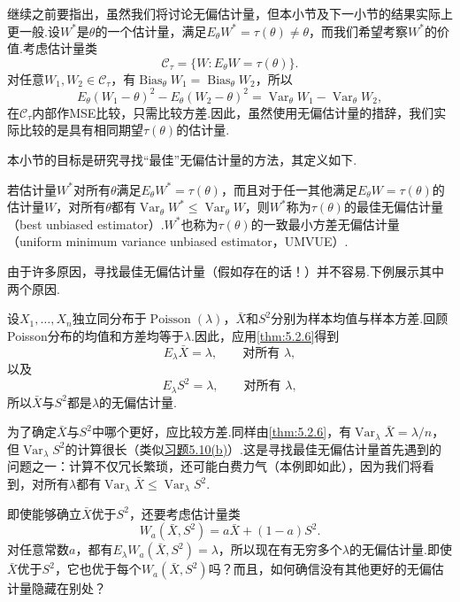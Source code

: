 继续之前要指出，虽然我们将讨论无偏估计量，但本小节及下一小节的结果实际上更一般.设$W^*$是$\theta$的一个估计量，满足$E_\theta W^*=\tau(\theta)\ne\theta$，而我们希望考察$W^*$的价值.考虑估计量类
$$\mathcal C_\tau=\{W:E_\theta W=\tau(\theta)\}.$$
对任意$W_1,W_2\in\mathcal C_\tau$，有$\operatorname{Bias}_\theta W_1=\operatorname{Bias}_\theta W_2$，所以
$$E_\theta(W_1-\theta)^2-E_\theta(W_2-\theta)^2=\operatorname{Var}_\theta W_1-\operatorname{Var}_\theta W_2,$$
在$\mathcal C_\tau$内部作MSE比较，只需比较方差.因此，虽然使用无偏估计量的措辞，我们实际比较的是具有相同期望$\tau(\theta)$的估计量.

本小节的目标是研究寻找“最佳”无偏估计量的方法，其定义如下.
\begin{definition}\label{def:7.3.7}
若估计量$W^*$对所有$\theta$满足$E_\theta W^*=\tau(\theta)$，而且对于任一其他满足$E_\theta W=\tau(\theta)$的估计量$W$，对所有$\theta$都有$\operatorname{Var}_\theta W^*\le\operatorname{Var}_\theta W$，则$W^*$称为$\tau(\theta)$的最佳无偏估计量（best unbiased estimator）.$W^*$也称为$\tau(\theta)$的一致最小方差无偏估计量（uniform minimum variance unbiased estimator，UMVUE）.
\end{definition}
由于许多原因，寻找最佳无偏估计量（假如存在的话！）并不容易.下例展示其中两个原因.
\begin{example}[Poisson分布的无偏估计]\label{ex:7.3.8}
设$X_1,\ldots,X_n$独立同分布于$\operatorname{Poisson}(\lambda)$，$\bar X$和$S^2$分别为样本均值与样本方差.回顾Poisson分布的均值和方差均等于$\lambda$.因此，应用\autoref{thm:5.2.6}得到
$$E_\lambda\bar X=\lambda,\qquad\text{对所有 }\lambda,$$
以及
$$E_\lambda S^2=\lambda,\qquad\text{对所有 }\lambda,$$
所以$\bar X$与$S^2$都是$\lambda$的无偏估计量.

为了确定$\bar X$与$S^2$中哪个更好，应比较方差.同样由\autoref{thm:5.2.6}，有$\operatorname{Var}_\lambda\bar X=\lambda/n$，但$\operatorname{Var}_\lambda S^2$的计算很长（类似\hyperref[exercise:5.10]{习题5.10(b)}）.这是寻找最佳无偏估计量首先遇到的问题之一：计算不仅冗长繁琐，还可能白费力气（本例即如此），因为我们将看到，对所有$\lambda$都有$\operatorname{Var}_\lambda\bar X\le\operatorname{Var}_\lambda S^2$.

即使能够确立$\bar X$优于$S^2$，还要考虑估计量类
$$W_a(\bar X,S^2)=a\bar X+(1-a)S^2.$$
对任意常数$a$，都有$E_\lambda W_a(\bar X,S^2)=\lambda$，所以现在有无穷多个$\lambda$的无偏估计量.即使$\bar X$优于$S^2$，它也优于每个$W_a(\bar X,S^2)$吗？而且，如何确信没有其他更好的无偏估计量隐藏在别处？
\end{example}

